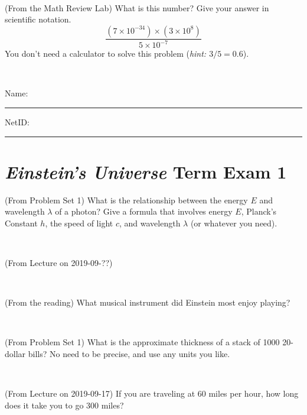 \documentclass[12pt, letterpaper]{article}
\begin{document}
\vfill ~

\begin{problem} (From the Math Review Lab)
What is this number? Give your answer in scientific notation.
$$
\frac{(7\times10^{-34})\times(3\times10^8)}{5\times10^{-7}}
$$
You don't need a calculator to solve this problem (\textit{hint: $3/5=0.6$}).
\end{problem}


\vfill ~


\cleardoublepage



\noindent
Name: \rule[-1ex]{0.60\textwidth}{0.1pt}
NetID: \rule[-1ex]{0.20\textwidth}{0.1pt}

\section*{\textsl{Einstein's Universe} Term Exam 1}
\setcounter{problem}{1}


\begin{problem} (From Problem Set 1)
What is the relationship between the energy $E$ and wavelength
$\lambda$ of a photon? Give a formula that involves energy $E$,
Planck's Constant $h$, the speed of light $c$, and wavelength
$\lambda$ (or whatever you need).
\end{problem}

\vfill ~

\begin{problem} (From Lecture on 2019-09-??)
\end{problem}


\vfill ~

\begin{problem} (From the reading)
What musical instrument did Einstein most enjoy playing?
\end{problem}


\vfill ~

\begin{problem} (From Problem Set 1)
What is the approximate thickness of a stack of 1000 20-dollar bills?
No need to be precise, and use any units you like.
\end{problem}


\vfill ~


\clearpage


\begin{problem} (From Lecture on 2019-09-17)
If you are traveling at 60 miles per hour, how long does
it take you to go 300 miles?
\end{problem}
\end{document}
